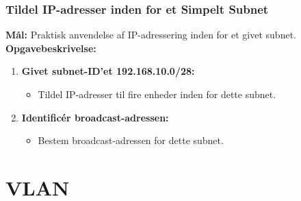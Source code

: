 \subsubsection*{Tildel IP-adresser inden for et Simpelt Subnet}
\textbf{Mål:} Praktisk anvendelse af IP-adressering inden for et givet subnet.
\newline\newline\noindent
\textbf{Opgavebeskrivelse:}
\begin{enumerate}
	\item \textbf{Givet subnet-ID'et 192.168.10.0/28:}
	\begin{itemize}
		\item Tildel IP-adresser til fire enheder inden for dette subnet.
	\end{itemize}
	\item \textbf{Identificér broadcast-adressen:}
	\begin{itemize}
		\item Bestem broadcast-adressen for dette subnet.
	\end{itemize}
\end{enumerate}

\section{VLAN}
